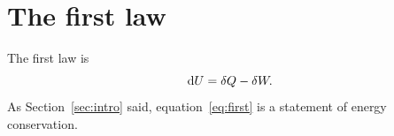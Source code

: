 \section{The first law}\label{sec:first}
The first law is
\begin{equation}\label{eq:first}
\mathrm{d}U = \delta Q - \delta W .
\end{equation}
As Section~\ref{sec:intro} said, equation~\eqref{eq:first} is a statement of energy conservation.
